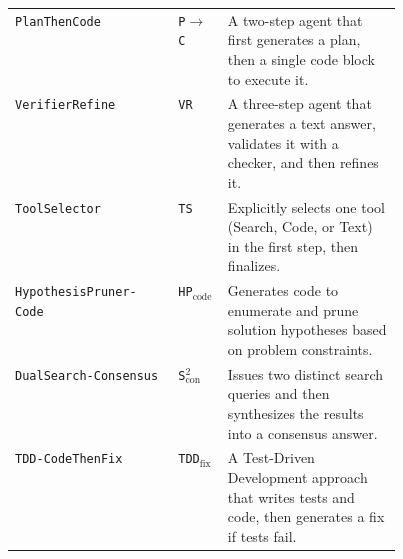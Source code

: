 \begin{table}[h!]
\begin{tabular}{@{}llp{0.45\linewidth}@{}}
\texttt{PlanThenCode} & \texttt{P$\rightarrow$C} & A two-step agent that first generates a plan, then a single code block to execute it. \\
\texttt{VerifierRefine} & \texttt{VR} & A three-step agent that generates a text answer, validates it with a checker, and then refines it. \\
\texttt{ToolSelector} & \texttt{TS} & Explicitly selects one tool (Search, Code, or Text) in the first step, then finalizes. \\
\texttt{HypothesisPruner-Code} & \texttt{HP$_{\text{code}}$} & Generates code to enumerate and prune solution hypotheses based on problem constraints. \\
\texttt{DualSearch-Consensus} & \texttt{S$^2_{\text{con}}$} & Issues two distinct search queries and then synthesizes the results into a consensus answer. \\
\texttt{TDD-CodeThenFix} & \texttt{TDD$_{\text{fix}}$} & A Test-Driven Development approach that writes tests and code, then generates a fix if tests fail. \\
\hline
\end{tabular}
\end{table}

